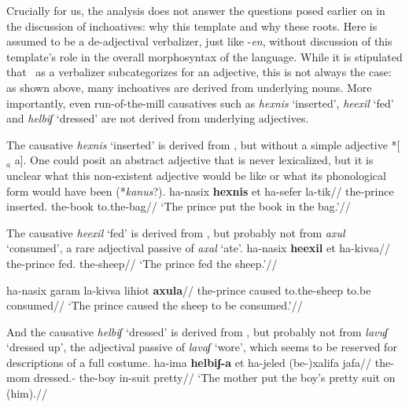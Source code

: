 Crucially for us, the analysis does not answer the questions posed earlier on in the discussion of inchoatives: why this template and why these roots. Here {\thif} is assumed to be a de-adjectival verbalizer, just like -\emph{en}, without discussion of this template's role in the overall morphosyntax of the language. While it is stipulated that \thif~as a verbalizer subcategorizes for an adjective, this is not always the case: as shown above, many inchoatives are derived from underlying nouns. More importantly, even run-of-the-mill causatives such as \emph{hexnis} `inserted', \emph{heexil} `fed' and \emph{helbiʃ} `dressed' are not derived from underlying adjectives.

The causative \emph{hexnis} `inserted' is derived from , but without a simple adjective *[$_{a}$  a]. One could posit an abstract adjective that is never lexicalized, but it is unclear what this non-existent adjective would be like or what its phonological form would have been (*\emph{kanus}?).
\ex \begingl
	\gla ha-nasix \textbf{hexnis} et ha-sefer la-tik//
	\glb the-prince inserted.  the-book to.the-bag//
	\glft `The prince put the book in the bag.'//
	\endgl
\xe

The causative \emph{heexil} `fed' is derived from , but probably not from \emph{axul} `consumed', a rare adjectival passive of \emph{axal} `ate'.
\pex
	\a \begingl
		\gla ha-nasix \textbf{heexil} et ha-kivsa//
		\glb the-prince fed.  the-sheep//
		\glft `The prince fed the sheep.'//
		\endgl
		
	\a \ljudge{$\ne$} \begingl
		\gla ha-nasix garam la-kivsa lihiot \textbf{axula}//
		\glb the-prince caused to.the-sheep to.be consumed//
		\glft `The prince caused the sheep to be consumed.'//
		\endgl
\xe

And the causative \emph{helbiʃ} `dressed' is derived from , but probably not from \emph{lavuʃ} `dressed up', the adjectival passive of \emph{lavaʃ} `wore', which seems to be reserved for descriptions of a full costume.
\pex
	\a \begingl
		\gla ha-ima \textbf{helbiʃ-a} et ha-jeled (be-)xalifa jafa//
		\glb the-mom dressed.-  the-boy in-suit pretty//
		\glft `The mother put the boy's pretty suit on (him).//
		\endgl
	
